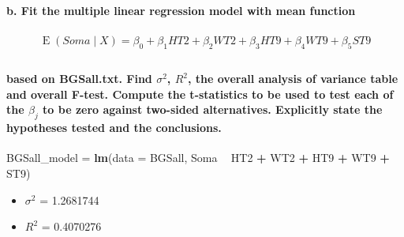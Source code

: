 \documentclass[]{article}
\newenvironment{Shaded}{\begin{snugshade}}{\end{snugshade}}
\newcommand{\KeywordTok}[1]{\textcolor[rgb]{0.13,0.29,0.53}{\textbf{#1}}}
\newcommand{\DataTypeTok}[1]{\textcolor[rgb]{0.13,0.29,0.53}{#1}}
\newcommand{\StringTok}[1]{\textcolor[rgb]{0.31,0.60,0.02}{#1}}
\newcommand{\OperatorTok}[1]{\textcolor[rgb]{0.81,0.36,0.00}{\textbf{#1}}}
\newcommand{\NormalTok}[1]{#1}
\providecommand{\tightlist}{%
  \setlength{\itemsep}{0pt}\setlength{\parskip}{0pt}}
\let\oldparagraph\paragraph
\renewcommand{\paragraph}[1]{\oldparagraph{#1}\mbox{}}
\begin{document}
\paragraph{b. Fit the multiple linear regression model with mean
function}\label{b.-fit-the-multiple-linear-regression-model-with-mean-function}

\[
\begin{align*}
 \operatorname{E} (Soma \mid X ) = \beta_0 + \beta_1 HT2 + \beta_2 WT2 + \beta_3 HT9 + \beta_4 WT9 + \beta_5 ST9   \\
\end{align*}
\]

\paragraph{\texorpdfstring{based on BGSall.txt. Find
\emph{\(\sigma^2\)}, \emph{\(R^2\)}, the overall analysis of variance
table and overall F-test. Compute the t-statistics to be used to test
each of the \emph{\(\beta_{j}\)} to be zero against two-sided
alternatives. Explicitly state the hypotheses tested and the
conclusions.}{based on BGSall.txt. Find \textbackslash{}sigma\^{}2, R\^{}2, the overall analysis of variance table and overall F-test. Compute the t-statistics to be used to test each of the \textbackslash{}beta\_\{j\} to be zero against two-sided alternatives. Explicitly state the hypotheses tested and the conclusions.}}\label{based-on-bgsall.txt.-find-sigma2-r2-the-overall-analysis-of-variance-table-and-overall-f-test.-compute-the-t-statistics-to-be-used-to-test-each-of-the-beta_j-to-be-zero-against-two-sided-alternatives.-explicitly-state-the-hypotheses-tested-and-the-conclusions.}

\begin{Shaded}
\begin{Highlighting}[]
\NormalTok{BGSall_model =}\StringTok{ }\KeywordTok{lm}\NormalTok{(}\DataTypeTok{data =}\NormalTok{ BGSall, Soma }\OperatorTok{~}\StringTok{ }\NormalTok{HT2 }\OperatorTok{+}\StringTok{ }\NormalTok{WT2 }\OperatorTok{+}\StringTok{ }\NormalTok{HT9 }\OperatorTok{+}\StringTok{ }\NormalTok{WT9 }\OperatorTok{+}\StringTok{ }\NormalTok{ST9)}
\end{Highlighting}
\end{Shaded}

\begin{itemize}
\tightlist
\item
  \emph{\(\sigma^2\)} = 1.2681744
\item
  \emph{\(R^2\)} = 0.4070276 
\end{itemize}
\end{document}

